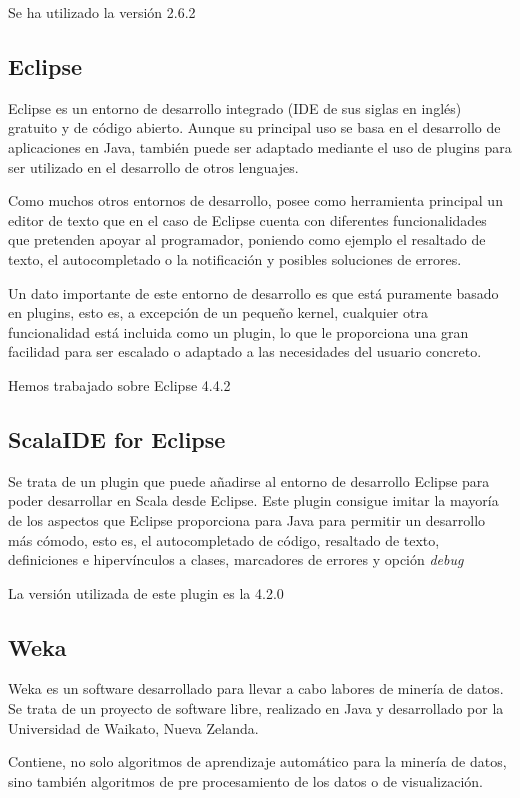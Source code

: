 Se ha utilizado la versión 2.6.2


\subsection{Eclipse}
Eclipse es un entorno de desarrollo integrado (IDE de sus siglas en inglés) gratuito y de código abierto. Aunque su principal uso se basa en el desarrollo de aplicaciones en Java, también puede ser adaptado mediante el uso de plugins para ser utilizado en el desarrollo de otros lenguajes.

Como muchos otros entornos de desarrollo, posee como herramienta principal un editor de texto que en el caso de Eclipse cuenta con diferentes funcionalidades que pretenden apoyar al programador, poniendo como ejemplo el resaltado de texto, el autocompletado o la notificación y posibles soluciones de errores.

Un dato importante de este entorno de desarrollo es que está puramente basado en plugins, esto es, a excepción de un pequeño kernel, cualquier otra funcionalidad está incluida como un plugin, lo que le proporciona una gran facilidad para ser escalado o adaptado a las necesidades del usuario concreto.

Hemos trabajado sobre Eclipse 4.4.2

\subsection{ScalaIDE for Eclipse}

Se trata de un plugin que puede añadirse al entorno de desarrollo Eclipse para poder desarrollar en Scala desde Eclipse.
Este plugin consigue imitar la mayoría de los aspectos que Eclipse proporciona para Java para permitir un desarrollo más cómodo, esto es, el autocompletado de código, resaltado de texto, definiciones e hipervínculos a clases, marcadores de errores y opción \textit{debug}

La versión utilizada de este plugin es la 4.2.0


\subsection{Weka}\label{sec:DefWeka}
Weka es un software desarrollado para llevar a cabo labores de minería de datos. Se trata de un proyecto de software libre, realizado en Java y desarrollado por la Universidad de Waikato, Nueva Zelanda.

Contiene, no solo algoritmos de aprendizaje automático para la minería de datos, sino también algoritmos de pre procesamiento de los datos o de visualización.

